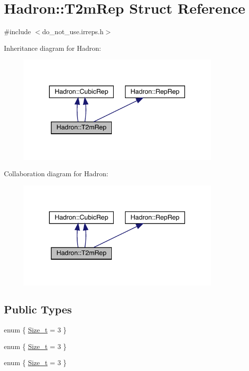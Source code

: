 \hypertarget{structHadron_1_1T2mRep}{}\section{Hadron\+:\+:T2m\+Rep Struct Reference}
\label{structHadron_1_1T2mRep}


{\ttfamily \#include $<$do\+\_\+not\+\_\+use.\+irreps.\+h$>$}



Inheritance diagram for Hadron\+:\nopagebreak
\begin{figure}[H]
\begin{center}
\leavevmode
\includegraphics[width=288pt]{d0/dfb/structHadron_1_1T2mRep__inherit__graph}
\end{center}
\end{figure}


Collaboration diagram for Hadron\+:\nopagebreak
\begin{figure}[H]
\begin{center}
\leavevmode
\includegraphics[width=288pt]{d8/d40/structHadron_1_1T2mRep__coll__graph}
\end{center}
\end{figure}
\subsection*{Public Types}
\begin{DoxyCompactItemize}
\item 
enum \{ \mbox{\hyperlink{structHadron_1_1T2mRep_a97ceb174b3c180cabd0702063e112862aa4b0f5962e540dfe4d59e9ece3dfdada}{Size\+\_\+t}} = 3
 \}
\item 
enum \{ \mbox{\hyperlink{structHadron_1_1T2mRep_a97ceb174b3c180cabd0702063e112862aa4b0f5962e540dfe4d59e9ece3dfdada}{Size\+\_\+t}} = 3
 \}
\item 
enum \{ \mbox{\hyperlink{structHadron_1_1T2mRep_a97ceb174b3c180cabd0702063e112862aa4b0f5962e540dfe4d59e9ece3dfdada}{Size\+\_\+t}} = 3
 \}
\end{DoxyCompactItemize}

